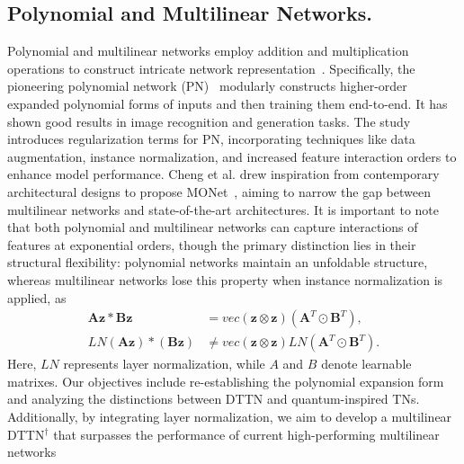 \subsection{Polynomial and Multilinear Networks.}
Polynomial and multilinear networks employ addition and multiplication operations to construct intricate network representation~\citep{chrysos2021deep,chrysos2023regularization,cheng2024multilinear}. 
Specifically, the pioneering polynomial network (PN)~\citep{chrysos2021deep} modularly constructs higher-order expanded polynomial forms of inputs and then training them end-to-end. It has shown good results in image recognition and generation tasks.
The study~\citep{chrysos2023regularization} introduces regularization terms for PN, incorporating techniques like data augmentation, instance normalization, and increased feature interaction orders to enhance model performance.
Cheng et al. drew inspiration from contemporary architectural designs to propose MONet~\citep{cheng2024multilinear}, aiming to narrow the gap between multilinear networks and state-of-the-art architectures.
It is important to note that both polynomial and multilinear networks can capture interactions of features at exponential orders, though the primary distinction lies in their structural flexibility: polynomial networks maintain an unfoldable structure, whereas multilinear networks lose this property when instance normalization is applied, as
\begin{equation}\begin{split}
\boldsymbol{A}\boldsymbol{z} * \boldsymbol{B}\boldsymbol{z} &= vec(\boldsymbol{z} \otimes \boldsymbol{z})(\boldsymbol{A}^T\odot \boldsymbol{B}^T),\\
LN(\boldsymbol{A}\boldsymbol{z} ) * (\boldsymbol{B}\boldsymbol{z}) &\neq vec(\boldsymbol{z} \otimes \boldsymbol{z})LN(\boldsymbol{A}^T\odot \boldsymbol{B}^T).
\label{eq2}
\end{split}\end{equation}
Here, $LN$ represents layer normalization, while $A$ and $B$ denote learnable matrixes.
Our objectives include re-establishing the polynomial expansion form and analyzing the distinctions between DTTN and quantum-inspired TNs. Additionally, by integrating layer normalization, we aim to develop a multilinear DTTN$^\dagger$ that surpasses the performance of current high-performing multilinear networks~\citep{cheng2024multilinear}